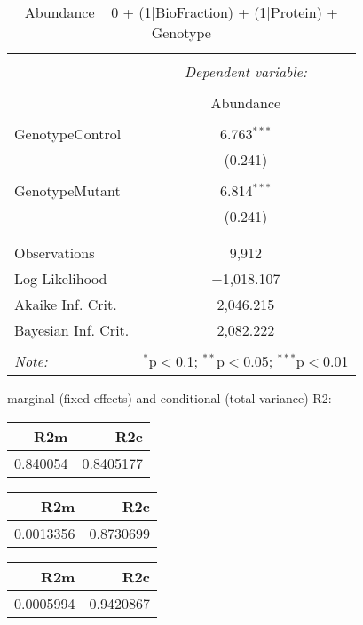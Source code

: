 \documentclass[11pt]{report}
\begin{document}
\begin{table}[!htbp] \centering 
  \caption{Abundance ~ 0 + (1|BioFraction) + (1|Protein) + Genotype} 
  \label{} 
\begin{tabular}{@{\extracolsep{5pt}}lc} 
\\[-1.8ex]\hline 
\hline \\[-1.8ex] 
 & \multicolumn{1}{c}{\textit{Dependent variable:}} \\ 
\cline{2-2} 
\\[-1.8ex] & Abundance \\ 
\hline \\[-1.8ex] 
 GenotypeControl & 6.763$^{***}$ \\ 
  & (0.241) \\ 
  & \\ 
 GenotypeMutant & 6.814$^{***}$ \\ 
  & (0.241) \\ 
  & \\ 
\hline \\[-1.8ex] 
Observations & 9,912 \\ 
Log Likelihood & $-$1,018.107 \\ 
Akaike Inf. Crit. & 2,046.215 \\ 
Bayesian Inf. Crit. & 2,082.222 \\ 
\hline 
\hline \\[-1.8ex] 
\textit{Note:}  & \multicolumn{1}{r}{$^{*}$p$<$0.1; $^{**}$p$<$0.05; $^{***}$p$<$0.01} \\ 
\end{tabular} 
\end{table} 
marginal (fixed effects) and conditional (total variance) R2:

\begin{tabular}{r|r}
\hline
R2m & R2c\\
\hline
0.840054 & 0.8405177\\
\hline
\end{tabular}

\begin{tabular}{r|r}
\hline
R2m & R2c\\
\hline
0.0013356 & 0.8730699\\
\hline
\end{tabular}

\begin{tabular}{r|r}
\hline
R2m & R2c\\
\hline
0.0005994 & 0.9420867\\
\hline
\end{tabular}
\end{document}
